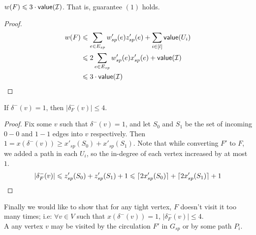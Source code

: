 \documentclass[./main.tex]{subfiles}
\DeclarePairedDelimiter\ceil{\lceil}{\rceil}
\begin{document}
		\begin{claim}
			$w(F) \leqslant 3\cdot\textsf{\textup{value}}(\mathcal{I})$. That is, guarantee $(1)$ holds.
		\end{claim}
		\begin{proof}
			\begin{align*}
				w(F) &\leqslant \sum_{e \in E_{sp}} w'_{sp}(e)z'_{sp}(e) + \sum_{i \in [l]} \textsf{\textup{value}}(U_i)\\
				 &\leqslant 2\sum_{e\in E_{sp}}w'_{sp}(e)x'_{sp}(e) + \textsf{\textup{value}}(\mathcal{I})\\
			 	&\leqslant 3\cdot\textsf{\textup{value}}(\mathcal{I})
			\end{align*}
		\end{proof}
		\begin{claim}
			If $\delta^-(v) = 1$, then $|\delta^-_F(v)|\leq 4$.
		\end{claim}
		\begin{proof}
			Fix some $v$ such that $\delta^-(v) = 1$, and let $S_0$ and $S_1$ be the set of incoming $0-0$ and $1-1$ edges into $v$ respectively. Then $1=x(\delta^-(v))\geq x'_{sp}(S_0) + x'_{sp}(S_1)$. Note that while converting $F'$ to $F$, we added a path in each $U_i$, so the in-degree of each vertex increased by at most $1$.
			\[
				|\delta^-_F(v)| \leqslant z'_{sp}(S_0) + z'_{sp}(S_1) + 1\leqslant \ceil{2x'_{sp}(S_0)} + \ceil{2x'_{sp}(S_1)} + 1
			\]
		\end{proof}
		Finally we would like to show that for any tight vertex, $F$ doesn't visit it too many times; i.e: $\forall v \in V$ such that $x(\delta^-(v)) = 1$, $|\delta^-_F(v)| \leqslant 4$.\\
		A any vertex $v$ may be visited by the circulation $F'$ in $G_{sp}$ or by some path $P_i$.
\end{document}
